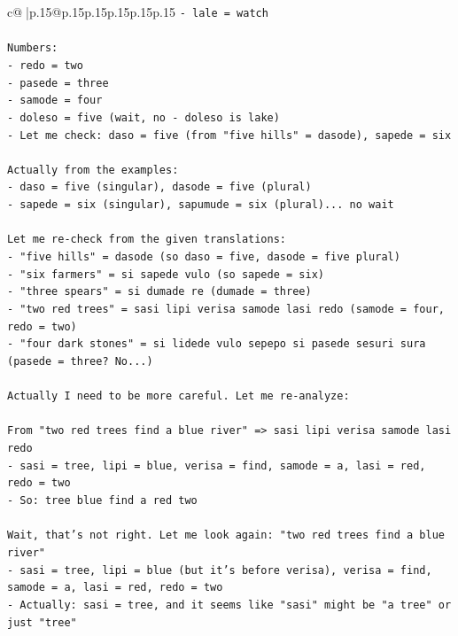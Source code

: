 \documentclass{article}
\begin{document}
{\begin{supertabular}{c@{$\;$}|p{.15\linewidth}@{}p{.15\linewidth}p{.15\linewidth}p{.15\linewidth}p{.15\linewidth}p{.15\linewidth}}
{{{\texttt{{-} lale = watch} \\
\\ 
\texttt{Numbers:} \\
\texttt{{-} redo = two} \\
\texttt{{-} pasede = three} \\
\texttt{{-} samode = four} \\
\texttt{{-} doleso = five (wait, no {-} doleso is lake)} \\
\texttt{{-} Let me check: daso = five (from "five hills" = dasode), sapede = six} \\
\\ 
\texttt{Actually from the examples:} \\
\texttt{{-} daso = five (singular), dasode = five (plural)} \\
\texttt{{-} sapede = six (singular), sapumude = six (plural)... no wait} \\
\\ 
\texttt{Let me re{-}check from the given translations:} \\
\texttt{{-} "five hills" = dasode (so daso = five, dasode = five plural)} \\
\texttt{{-} "six farmers" = si sapede vulo (so sapede = six)} \\
\texttt{{-} "three spears" = si dumade re (dumade = three)} \\
\texttt{{-} "two red trees" = sasi lipi verisa samode lasi redo (samode = four, redo = two)} \\
\texttt{{-} "four dark stones" = si lidede vulo sepepo si pasede sesuri sura (pasede = three? No...)} \\
\\ 
\texttt{Actually I need to be more careful. Let me re{-}analyze:} \\
\\ 
\texttt{From "two red trees find a blue river" => sasi lipi verisa samode lasi redo} \\
\texttt{{-} sasi = tree, lipi = blue, verisa = find, samode = a, lasi = red, redo = two} \\
\texttt{{-} So: tree blue find a red two} \\
\\ 
\texttt{Wait, that's not right. Let me look again: "two red trees find a blue river"} \\
\texttt{{-} sasi = tree, lipi = blue (but it's before verisa), verisa = find, samode = a, lasi = red, redo = two} \\
\texttt{{-} Actually: sasi = tree, and it seems like "sasi" might be "a tree" or just "tree"} \\
}}}
\end{supertabular}}
\end{document}
